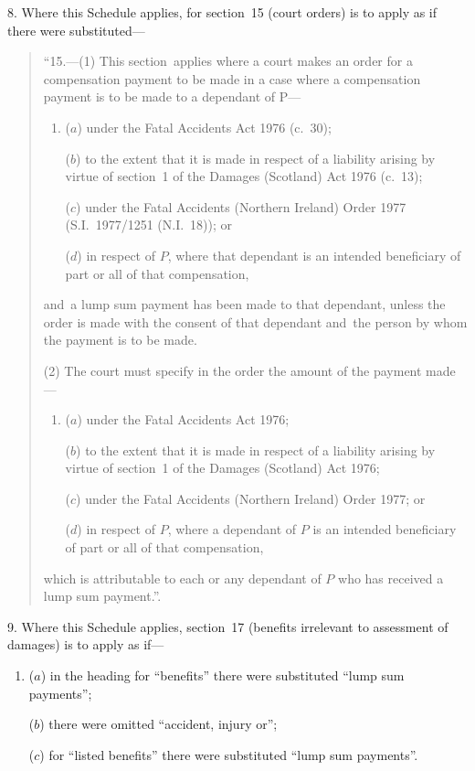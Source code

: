 \documentclass[12pt,a4paper]{article}
\begin{document}
\medskip

8.  Where this Schedule applies, for section~15 (court orders) is to apply as if there were substituted—
\begin{quotation}
“15.---(1)  This section~applies where a court makes an order for a compensation payment to be made in a case where a compensation payment is to be made to a dependant of P—
\begin{enumerate}\item[]
($a$) under the Fatal Accidents Act 1976 (c.~30);

($b$) to the extent that it is made in respect of a liability arising by virtue of section~1 of the Damages (Scotland) Act 1976 (c.~13);

($c$) under the Fatal Accidents (Northern Ireland) Order 1977 (S.I.~1977/1251 (N.I.~18)); or

($d$) in respect of $P$, where that dependant is an intended beneficiary of part or all of that compensation,
\end{enumerate}
and~a lump sum payment has been made to that dependant, unless the order is made with the consent of that dependant and~the person by whom the payment is to be made.

(2) The court must specify in the order the amount of the payment made—
\begin{enumerate}\item[]
($a$) under the Fatal Accidents Act 1976;

($b$) to the extent that it is made in respect of a liability arising by virtue of section~1 of the Damages (Scotland) Act 1976;

($c$) under the Fatal Accidents (Northern Ireland) Order 1977; or

($d$) in respect of $P$, where a dependant of $P$ is an intended beneficiary of part or all of that compensation,
\end{enumerate}
which is attributable to each or any dependant of $P$ who has received a lump sum   payment.”.
\end{quotation}

\medskip

9.  Where this Schedule applies, section~17 (benefits irrelevant to assessment of damages) is to apply as if—
\begin{enumerate}\item[]
($a$) in the heading for “benefits” there were substituted “lump sum payments”;

($b$) there were omitted “accident, injury or”;

($c$) for “listed benefits” there were substituted “lump sum payments”.
\end{enumerate}
\end{document}
